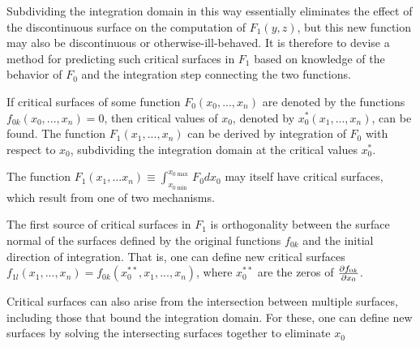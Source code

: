 Subdividing the integration domain in this way essentially eliminates the effect of the discontinuous surface on the computation of $F_1\left(y,z\right)$, but this new function may also be discontinuous or otherwise-ill-behaved. It is therefore to devise a method for predicting such critical surfaces in $F_1$ based on knowledge of the behavior of $F_0$ and the integration step connecting the two functions.

If critical surfaces of some function $F_0\left(x_0,...,x_n\right)$ are denoted by the functions $f_{0k}\left(x_0,...,x_n\right)=0$, then critical values of $x_0$, denoted by $x_0^*\left(x_1,...,x_n\right)$, can be found. The function $F_1\left(x_1,...,x_n\right)$ can be derived by integration of $F_0$ with respect to $x_0$, subdividing the integration domain at the critical values $x_0^*$. 

The function 
${F_1}\left( {{x_1},...{x_n}} \right) \equiv \int_{{x_{0\min }}}^{{x_{0\max }}} {{F_0}d{x_0}} $
may itself have critical surfaces, which result from one of two mechanisms. 

The first source of critical surfaces in $F_1$ is orthogonality between the surface normal of the surfaces defined by the original functions $f_{0k}$ and the initial direction of integration. That is, one can define new critical surfaces $f_{1l}\left(x_1,...,x_n\right)=f_{0k}\left(x^{**}_0,x_1,...,x_n\right)$, where $x^{**}_0$ are the zeros of $\frac{\partial f_{0k}}{\partial x_0}$. 

Critical surfaces can also arise from the intersection between multiple surfaces, including those that bound the integration domain. For these, one can define new surfaces by solving the intersecting surfaces together to eliminate $x_0$

